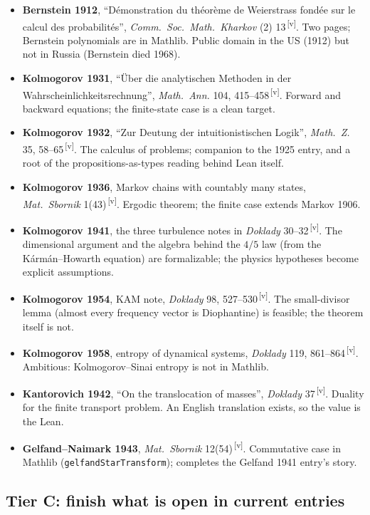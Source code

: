 \documentclass[11pt]{article}
\newcommand{\verify}{\textsuperscript{\color{gray}\,[v]}}
\begin{document}
\begin{itemize}
\item \textbf{Bernstein 1912}, ``Démonstration du théorème de Weierstrass fondée sur le calcul des probabilités'', \emph{Comm.\ Soc.\ Math.\ Kharkov} (2) 13\verify. Two pages; Bernstein polynomials are in Mathlib. Public domain in the US (1912) but not in Russia (Bernstein died 1968).
\item \textbf{Kolmogorov 1931}, ``Über die analytischen Methoden in der Wahrscheinlichkeitsrechnung'', \emph{Math.\ Ann.} 104, 415--458\verify. Forward and backward equations; the finite-state case is a clean target.
\item \textbf{Kolmogorov 1932}, ``Zur Deutung der intuitionistischen Logik'', \emph{Math.\ Z.} 35, 58--65\verify. The calculus of problems; companion to the 1925 entry, and a root of the propositions-as-types reading behind Lean itself.
\item \textbf{Kolmogorov 1936}, Markov chains with countably many states, \emph{Mat.\ Sbornik} 1(43)\verify. Ergodic theorem; the finite case extends Markov 1906.
\item \textbf{Kolmogorov 1941}, the three turbulence notes in \emph{Doklady} 30--32\verify. The dimensional argument and the algebra behind the $4/5$ law (from the K\'arm\'an--Howarth equation) are formalizable; the physics hypotheses become explicit assumptions.
\item \textbf{Kolmogorov 1954}, KAM note, \emph{Doklady} 98, 527--530\verify. The small-divisor lemma (almost every frequency vector is Diophantine) is feasible; the theorem itself is not.
\item \textbf{Kolmogorov 1958}, entropy of dynamical systems, \emph{Doklady} 119, 861--864\verify. Ambitious: Kolmogorov--Sinai entropy is not in Mathlib.
\item \textbf{Kantorovich 1942}, ``On the translocation of masses'', \emph{Doklady} 37\verify. Duality for the finite transport problem. An English translation exists, so the value is the Lean.
\item \textbf{Gelfand--Naimark 1943}, \emph{Mat.\ Sbornik} 12(54)\verify. Commutative case in Mathlib (\texttt{gelfandStarTransform}); completes the Gelfand 1941 entry's story.
\end{itemize}

\subsection{Tier C: finish what is open in current entries}
\end{document}
